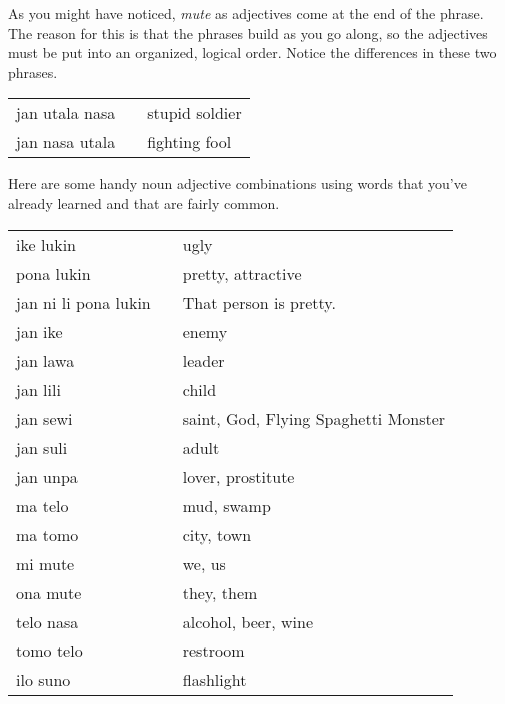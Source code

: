 As you might have noticed, \textit{mute} as adjectives come at the end of the phrase.
The reason for this is that the phrases build as you go along, so the adjectives must be put into an organized, logical order.
Notice the differences in these two phrases.

\begin{supertabular}{p{5,5cm}|ll}
    jan utala nasa &  & stupid soldier \\
    jan nasa utala &  & fighting fool  \\
\end{supertabular}

Here are some handy noun adjective combinations using words that you've already learned and that are fairly common.

\begin{supertabular}{p{5,5cm}|ll}
    ike lukin            &  & ugly                                 \\
    pona lukin           &  & pretty, attractive                   \\
    jan ni li pona lukin &  & That person is pretty.               \\
    jan ike              &  & enemy                                \\
    jan lawa             &  & leader                               \\
    jan lili             &  & child                                \\
    jan sewi             &  & saint, God, Flying Spaghetti Monster \\
    jan suli             &  & adult                                \\
    jan unpa             &  & lover, prostitute                    \\
    ma telo              &  & mud, swamp                           \\
    ma tomo              &  & city, town                           \\
    mi mute              &  & we, us                               \\
    ona mute             &  & they, them                           \\
    telo nasa            &  & alcohol, beer, wine                  \\
    tomo telo            &  & restroom                             \\
    ilo suno             &  & flashlight                           \\
\end{supertabular}

